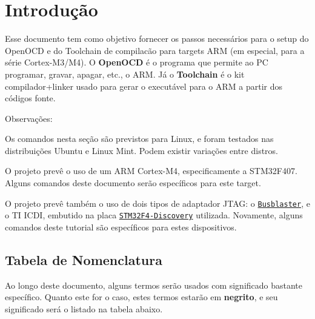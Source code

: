 \hypertarget{page_setup_page_setup_sec_introduction}{}\section{Introdução}\label{page_setup_page_setup_sec_introduction}
Esse documento tem como objetivo fornecer os passos necessários para o setup do Open\+O\+CD e do Toolchain de compilacão para targets A\+RM (em especial, para a série Cortex-\/\+M3/\+M4). O {\bfseries Open\+O\+CD} é o programa que permite ao PC programar, gravar, apagar, etc., o A\+RM. Já o {\bfseries Toolchain} é o kit compilador+linker usado para gerar o executável para o A\+RM a partir dos códigos fonte.

Observações\+:
\begin{DoxyItemize}
\item Os comandos nesta seção são previstos para Linux, e foram testados nas distribuições Ubuntu e Linux Mint. Podem existir variações entre distros.
\item O projeto prevê o uso de um A\+RM Cortex-\/\+M4, especificamente a S\+T\+M32\+F407. Alguns comandos deste documento serão específicos para este target.
\item O projeto prevê também o uso de dois tipos de adaptador J\+T\+AG\+: o \href{http://dangerousprototypes.com/docs/Bus_Blaster}{\tt Busblaster}, e o TI I\+C\+DI, embutido na placa \href{http://www.st.com/stm32f4-discovery}{\tt S\+T\+M32\+F4-\/\+Discovery} utilizada. Novamente, alguns comandos deste tutorial são específicos para estes dispositivos.
\end{DoxyItemize}\hypertarget{page_setup_page_setup_sec_introduction_subsec_ton}{}\subsection{Tabela de Nomenclatura}\label{page_setup_page_setup_sec_introduction_subsec_ton}
Ao longo deste documento, alguns termos serão usados com significado bastante específico. Quanto este for o caso, estes termos estarão em {\bfseries negrito}, e seu significado será o listado na tabela abaixo.

